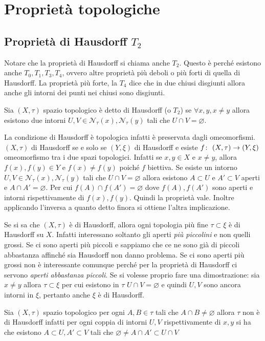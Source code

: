 \chapter{Proprietà topologiche}

\section{Proprietà di Hausdorff $T_2$}

Notare che la proprietà di Hausdorff si chiama anche $T_2$. Questo è perché esistono anche $T_0, T_1, T_3, T_4$, ovvero altre proprietà più deboli o più forti di quella di Hausdorff. La proprietà più forte, la $T_4$ dice che in due chiusi disgiunti allora anche gli intorni dei punti nei chiusi sono disgiunti.

\begin{definition}
	Sia $(X, \tau)$ spazio topologico è detto di Hausdorff (o $T_2$) se $\forall x, y, x \neq y$ allora esistono due intorni $U, V \in \mathcal{N}_\tau(x),\mathcal{N}_\tau(y)$ tali che $U \cap V = \varnothing$.
\end{definition} 
\begin{remark}
	La condizione di Hausdorff è topologica  infatti è preservata dagli omeomorfismi. $(X,\tau)$ di Hausdorff se e solo se $(Y,\xi)$ di Hausdorff e esiste $f \colon\ (X,\tau) \rightarrow (Y,\xi)$ omeomorfismo tra i due spazi topologici. Infatti se $x,y \in X$ e $x\neq y$, allora $f(x), f(y) \in Y$ e $f(x) \neq f(y)$ poiché $f$ biettiva. Se esiste un intorno $U,V\in \mathcal{N}_\tau(x),\mathcal{N}_\tau(y)$ tali che $U \cap V = \varnothing$ allora esistono $A \subset U$ e $A' \subset V$ aperti e $A \cap A' = \varnothing$. Per cui $f(A) \cap f(A') = \varnothing$ dove $f(A), f(A')$ sono aperti e intorni rispettivamente di $f(x),f(y)$. Quindi la proprietà vale. Inoltre applicando l'inversa a quanto detto finora si ottiene l'altra implicazione.
\end{remark} 
\begin{remark}
	Se si sa che $(X, \tau)$ è di Hausdorff, allora ogni topologia più fine $\tau \subset \xi$ è di Hausdorff su $X$. Infatti interessano soltanto gli aperti \textit{più piccolini} e non quelli grossi. Se ci sono aperti più piccoli e sappiamo che ce ne sono già di piccoli abbastanza affinché sia Hausdorff non danno problema. Se ci sono aperti più grossi non è interessante comunque perché per la proprietà di Hausdorff ci servono \textit{aperti abbastanza piccoli}. Se si volesse proprio fare una dimostrazione: sia $x \neq y$ allora $\tau \subset \xi$ per cui esistono in $\tau$ $U \cap V = \varnothing$ e quindi $U, V$ sono ancora intorni in $\xi$, pertanto anche $\xi$ è di Hausdorff. 
\end{remark}
\begin{remark}
	Sia $(X, \tau)$ spazio topologico per ogni $A, B\in \tau$ tali che $A\cap B \neq \varnothing$ allora $\tau$ non è di Hausdorff infatti per ogni coppia di intorni $U, V$ rispettivamente di $x, y$ si ha che esistono $A \subset U, A' \subset V$ tali che $\varnothing \neq A\cap A' \subset U \cap V$
\end{remark} 

